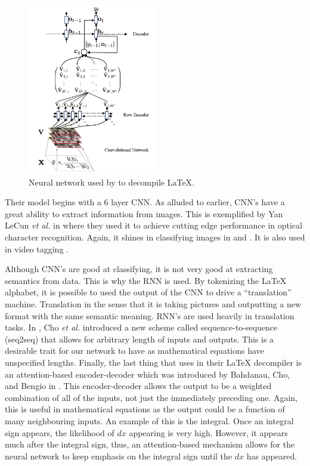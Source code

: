 \documentclass{article}
\begin{document}
\begin{figure}[h]
  \centering
  \includegraphics[width=0.5\textwidth]{neural-network.png}
  \caption{Neural network used by \cite{1609.04938} to decompile \LaTeX{}.}
\end{figure}

Their model begins with a 6 layer CNN. As alluded to earlier, CNN's have a great
ability to extract information from images. This is exemplified by Yan LeCun
\textit{et al.} in\cite{lecun_bottou_bengio_haffner_1998} where they used it
to achieve cutting edge performance in optical character recognition. Again,
it shines in classifying images in \cite{NIPS2012_4824} and \cite{szegedy2013deep}.
It is also used in video tagging \cite{karpathy2014large}.

Although CNN's are good at classifying, it is not very good at extracting semantics
from data. This is why the RNN is used. By tokenizing the \LaTeX{} alphabet, it
is possible to used the output of the CNN to drive a ``translation'' machine.
Translation in the sense that it is taking pictures and outputting a new format
with the same semantic meaning. RNN's are used heavily in translation tasks.
In \cite{1406.1078}, Cho \textit{et al.} introduced a new scheme called
sequence-to-sequence (seq2seq) that allows for arbitrary length of inputs and outputs.
This is a desirable trait for our network to have as mathematical equations have
unspecified lengths. Finally, the last thing that \cite{1609.04938} uses in their
\LaTeX{} decompiler is an attention-based encoder-decoder which was introduced by
Bahdanau, Cho, and Bengio in \cite{1409.0473}. This encoder-decoder allows
the output to be a weighted combination of all of the inputs, not just the immediately
preceding one. Again, this is useful in mathematical equations as the output could
be a function of many neighbouring inputs. An example of this is the integral. Once
an integral sign appears, the likelihood of $dx$ appearing is very high. However,
it appears much after the integral sign, thus, an attention-based mechanism allows
for the neural network to keep emphasis on the integral sign until the $dx$ has appeared.
\end{document}
